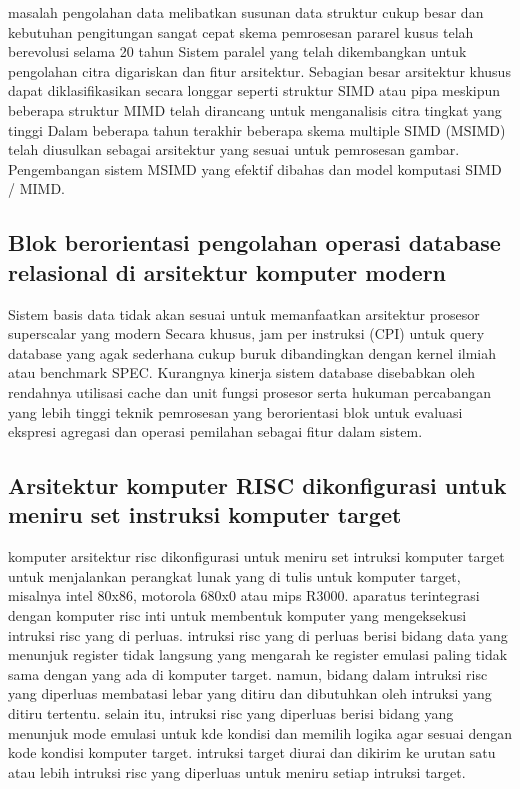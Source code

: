	masalah pengolahan data melibatkan susunan data struktur cukup besar dan kebutuhan pengitungan sangat cepat skema pemrosesan pararel  kusus telah berevolusi selama 20 tahun 
	Sistem paralel yang telah dikembangkan untuk pengolahan citra digariskan dan fitur arsitektur.
	Sebagian besar arsitektur khusus dapat diklasifikasikan secara longgar seperti struktur SIMD atau pipa meskipun beberapa struktur MIMD telah dirancang untuk menganalisis citra tingkat yang  tinggi
	Dalam beberapa tahun terakhir beberapa skema multiple SIMD (MSIMD) telah diusulkan sebagai arsitektur yang sesuai untuk pemrosesan gambar.
	Pengembangan sistem MSIMD yang efektif dibahas dan model komputasi SIMD / MIMD.\cite{reeves1984parallel}

	\subsection{Blok berorientasi pengolahan operasi database relasional di arsitektur komputer modern}

	Sistem basis data tidak  akan sesuai untuk memanfaatkan arsitektur prosesor superscalar  yang modern Secara khusus, jam per instruksi (CPI) untuk query database yang agak sederhana cukup buruk dibandingkan dengan kernel ilmiah atau benchmark SPEC.
	Kurangnya kinerja sistem database disebabkan oleh rendahnya utilisasi cache dan unit fungsi prosesor serta hukuman percabangan yang lebih tinggi
	teknik pemrosesan yang berorientasi blok untuk evaluasi ekspresi agregasi dan operasi pemilahan sebagai fitur dalam sistem.\cite{padmanabhan2001block}

	\subsection{Arsitektur komputer RISC dikonfigurasi untuk meniru set instruksi komputer target}

	komputer arsitektur risc dikonfigurasi untuk meniru set intruksi komputer target untuk menjalankan perangkat lunak yang di tulis untuk komputer target, misalnya intel 80x86, motorola 680x0 atau mips R3000. 
	aparatus terintegrasi dengan komputer risc inti untuk membentuk komputer yang mengeksekusi intruksi risc yang di perluas.
	intruksi risc yang di perluas berisi bidang data yang menunjuk register tidak langsung yang mengarah ke register emulasi paling tidak sama dengan yang ada di komputer target. 
	namun, bidang dalam intruksi risc yang diperluas membatasi lebar yang ditiru dan dibutuhkan oleh intruksi yang ditiru tertentu.
	selain itu, intruksi risc yang diperluas berisi bidang yang menunjuk mode emulasi untuk kde kondisi dan memilih logika agar sesuai dengan kode kondisi komputer target. 
	intruksi target diurai dan dikirim ke urutan satu atau lebih intruksi risc yang diperluas untuk meniru setiap intruksi target.\cite{scantlin1996risc}

